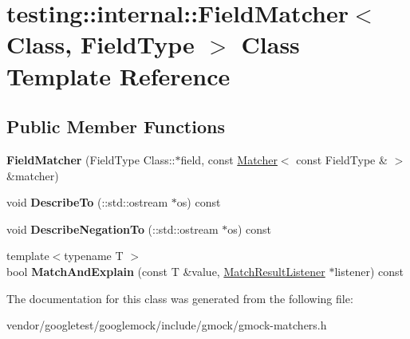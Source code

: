 \hypertarget{classtesting_1_1internal_1_1FieldMatcher}{}\section{testing\+:\+:internal\+:\+:Field\+Matcher$<$ Class, Field\+Type $>$ Class Template Reference}
\label{classtesting_1_1internal_1_1FieldMatcher}
\subsection*{Public Member Functions}
\begin{DoxyCompactItemize}
\item 
{\bfseries Field\+Matcher} (Field\+Type Class\+::$\ast$field, const \hyperlink{classtesting_1_1Matcher}{Matcher}$<$ const Field\+Type \& $>$ \&matcher)\hypertarget{classtesting_1_1internal_1_1FieldMatcher_adf3435dcc9592b75e474cc90b1424952}{}\label{classtesting_1_1internal_1_1FieldMatcher_adf3435dcc9592b75e474cc90b1424952}

\item 
void {\bfseries Describe\+To} (\+::std\+::ostream $\ast$os) const \hypertarget{classtesting_1_1internal_1_1FieldMatcher_ac3b02441e2254652579c6e98a25c9b5b}{}\label{classtesting_1_1internal_1_1FieldMatcher_ac3b02441e2254652579c6e98a25c9b5b}

\item 
void {\bfseries Describe\+Negation\+To} (\+::std\+::ostream $\ast$os) const \hypertarget{classtesting_1_1internal_1_1FieldMatcher_aae4069f3686609c9612798e73f28ca05}{}\label{classtesting_1_1internal_1_1FieldMatcher_aae4069f3686609c9612798e73f28ca05}

\item 
{\footnotesize template$<$typename T $>$ }\\bool {\bfseries Match\+And\+Explain} (const T \&value, \hyperlink{classtesting_1_1MatchResultListener}{Match\+Result\+Listener} $\ast$listener) const \hypertarget{classtesting_1_1internal_1_1FieldMatcher_a68fd542e3933c11da824e5e93d3f9858}{}\label{classtesting_1_1internal_1_1FieldMatcher_a68fd542e3933c11da824e5e93d3f9858}

\end{DoxyCompactItemize}


The documentation for this class was generated from the following file\+:\begin{DoxyCompactItemize}
\item 
vendor/googletest/googlemock/include/gmock/gmock-\/matchers.\+h\end{DoxyCompactItemize}
